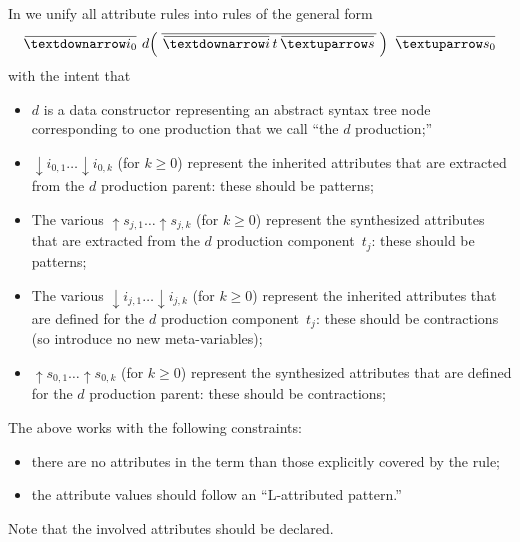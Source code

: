 \documentclass[11pt]{article} %
\begin{document}
In  we unify all attribute rules into rules of the general form
\begin{equation}
  \ov{{↓}i_0}  ~ d\!\left(\,\ov{\, \ov{{↓}i} \, t \, \ov{{↑}s} \,}\,\right) ~ \ov{{↑}s_0}
  \label{eq:attributes}
\end{equation}
with the intent that
\begin{itemize}

\item $d$ is a data constructor representing an abstract syntax tree node corresponding to one
  production that we call ``the $d$ production;''

\item ${↓}i_{0,1}…{↓}i_{0,k}$ (for $k≥0$) represent the inherited attributes that are extracted from
  the $d$ production parent: these should be patterns;

\item The various ${↑}s_{j,1}…{↑}s_{j,k}$ (for $k≥0$) represent the synthesized attributes that are
  extracted from the $d$ production component~$t_j$: these should be patterns;

\item The various ${↓}i_{j,1}…{↓}i_{j,k}$ (for $k≥0$) represent the inherited attributes that are
  defined for the $d$ production component~$t_j$: these should be contractions (so introduce no new
  meta-variables);

\item ${↑}s_{0,1}…{↑}s_{0,k}$ (for $k≥0$) represent the synthesized attributes that are defined for
  the $d$ production parent: these should be contractions;

\end{itemize}
The above works with the following constraints:
\begin{itemize}
\item there are no attributes in the term than those explicitly covered by the rule;
\item the attribute values should follow an ``L-attributed pattern.''
\end{itemize}
Note that the involved attributes should be declared.
\end{document}
